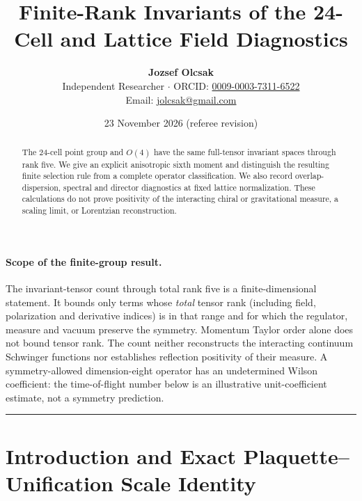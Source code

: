 \documentclass[11pt,a4paper]{article}
\title{Finite-Rank Invariants of the 24-Cell and Lattice Field Diagnostics}
\author{\textbf{Jozsef Olcsak}\\
\small Independent Researcher $\cdot$ ORCID: \href{https://orcid.org/0009-0003-7311-6522}{0009-0003-7311-6522}\\
\small Email: \href{mailto:jolcsak@gmail.com}{jolcsak@gmail.com}}
\date{23 November 2026 (referee revision)}
\begin{document}
\maketitle

\begin{abstract}
\noindent The 24-cell point group and $O(4)$ have the same full-tensor invariant spaces through rank five. We give an explicit anisotropic sixth moment and distinguish the resulting finite selection rule from a complete operator classification. We also record overlap-dispersion, spectral and director diagnostics at fixed lattice normalization. These calculations do not prove positivity of the interacting chiral or gravitational measure, a scaling limit, or Lorentzian reconstruction.
\end{abstract}

\paragraph{Scope of the finite-group result.}
The invariant-tensor count through total rank five is a finite-dimensional
statement. It bounds only terms whose \emph{total} tensor rank (including
field, polarization and derivative indices) is in that range and for which
the regulator, measure and vacuum preserve the symmetry. Momentum Taylor
order alone does not bound tensor rank. The count neither reconstructs the
interacting continuum Schwinger functions nor establishes reflection
positivity of their measure. A symmetry-allowed dimension-eight operator
has an undetermined Wilson coefficient: the time-of-flight number below
is an illustrative unit-coefficient estimate, not a symmetry prediction.


\tableofcontents
\vspace{0.4em}
\hrule
\vspace{0.8em}

\section{Introduction and Exact Plaquette--Unification Scale Identity}
\label{sec:intro}
\end{document}
